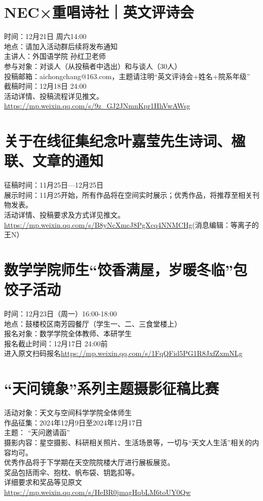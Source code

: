 \documentclass[letterpaper, 12pt]{article}
\begin{document}
\begin{multicols}{2}
\section{NEC×重唱诗社｜英文评诗会}
时间：12月21日 周六14:00\\
地点：请加入活动群后续将发布通知\\
主讲人：外国语学院 孙红卫老师\\
参与对象：对谈人（从投稿者中选出）和与谈人（30人）\\
投稿邮箱：aichongchang@163.com，主题请注明“英文评诗会+姓名+院系年级”\\
截稿时间：12月18日 24:00\\
活动详情、投稿流程详见推文。\url{https://mp.weixin.qq.com/s/9z_GJ2JNmnKpr1HhVwAWsg}\\


\section{关于在线征集纪念叶嘉莹先生诗词、楹联、文章的通知}
征稿时间：11月25日—12月25日\\
展示时间：11月25开始，所有作品将在空间实时展示；优秀作品，将推荐至相关刊物发表。\\
活动详情、投稿要求及方式详见推文。\url{https://mp.weixin.qq.com/s/B8yNcXmcJ8PgXcq4NNMCHg}(消息编辑：等离子的王N）\\

\section{数学学院师生“饺香满屋，岁暖冬临”包饺子活动}
时间：12月23日（周一）16:00-18:00\\
地点：鼓楼校区南芳园餐厅（学生一、二、三食堂楼上）\\
报名对象：数学学院全体教师、本研学生\\
报名截止时间：12月17日 24:00前\\
进入原文扫码报名\url{https://mp.weixin.qq.com/s/1FqQFid5PG1R8JxfZxmNLg}

\section{“天问镜象”系列主题摄影征稿比赛}
活动对象：天文与空间科学学院全体师生\\
作品征集：2024年12月9日至2024年12月17日\\
主题： “天问邀请函”\\
摄影内容：星空摄影、科研相关照片、生活场景等，一切与“天文人生活”相关的内容均可。\\
优秀作品将于下学期在天空院院楼大厅进行展板展览。\\
奖品包括雨伞、抱枕、帆布袋、钥匙扣等。\\
详细要求和奖品等见原文\url{https://mp.weixin.qq.com/s/HeBR0jmagHqbLM6toUY0Qw}


\end{multicols}
\end{document}
